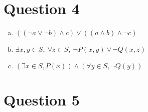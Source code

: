 \documentclass[12pt]{article}
\begin{document}
\section*{Question 4}
\begin{enumerate}[a.]
    \item

    $((\neg a \lor \neg b) \land c) \lor ((a \land b) \land \neg c)$

    \item

    $\exists x,y \in S,\:\forall z \in S,\:\neg P(x,y) \lor \neg Q(x,z)$

    \item

    $(\exists x \in S, P(x)) \land (\forall y \in S, \neg Q(y))$
\end{enumerate}

\section*{Question 5}
\end{document}
